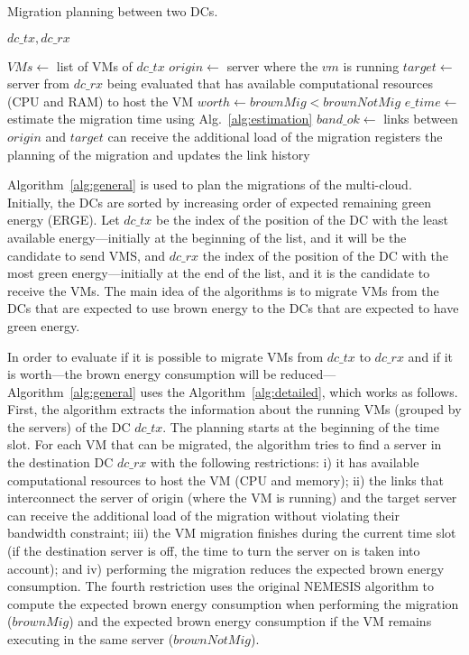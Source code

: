 \begin{algorithm}[h]
\begin{algorithmic}
\caption{Migration planning between two DCs.}\label{alg:detailed}
\Require $dc\_tx,dc\_rx$

\State $VMs \gets$ list of VMs of $dc\_tx$
    \State $origin \gets$ server where the $vm$ is running
    \State $target \gets$ server from $dc\_rx$ being evaluated that has available computational resources (CPU and RAM) to host the VM
    \State $worth \gets brownMig < brownNotMig $
    \State $e\_time \gets $ estimate the migration time using Alg.~\ref{alg:estimation} 
    \State $band\_ok \gets$ links between $origin$ and $target$ can receive the additional load of the migration
    \State registers the planning of the migration and updates the link history   
    \EndIf
\EndFor

\end{algorithmic}
\end{algorithm}

Algorithm~\ref{alg:general} is used to plan the migrations of the multi-cloud. Initially, the DCs are sorted by increasing order of expected remaining green energy (ERGE). Let $dc\_tx$  be the index of the position of the DC with the least available energy---initially at the beginning of the list, and it will be the candidate to send VMS, and $dc\_rx$ the index of the position of the DC with the most green energy---initially at the end of the list, and it is the candidate to receive the VMs. The main idea of the algorithms is to migrate VMs from the DCs that are expected to use brown energy to the DCs that are expected to have green energy. 

In order to evaluate if it is possible to migrate VMs from $dc\_tx$ to $dc\_rx$ and if it is worth---the brown energy consumption will be reduced---Algorithm~\ref{alg:general} uses the Algorithm~\ref{alg:detailed}, which works as follows. 
First, the algorithm extracts the information about the running VMs (grouped by the servers) of the DC $dc\_tx$. The planning starts at the beginning of the time slot. For each VM that can be migrated, the algorithm tries to find a server in the destination DC $dc\_rx$ with the following restrictions: i) it has available computational resources to host the VM (CPU and memory); ii) the links that interconnect the server of origin (where the VM is running) and the target server can receive the additional load of the migration without violating their bandwidth constraint; iii) the VM migration finishes during the current time slot (if the destination server is off, the time to turn the server on is taken into account); and iv) performing the migration reduces the expected brown energy consumption. The fourth restriction uses the original NEMESIS algorithm to compute the expected brown energy consumption when performing the migration ($brownMig$) and the expected brown energy consumption if the VM remains executing in the same server ($brownNotMig$).

